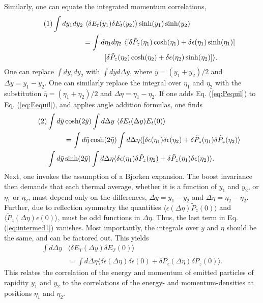 \documentclass[12pt]{article}
\numberwithin{equation}{section}
\numberwithin{figure}{section}
\newcommand\eqnumber{\addtocounter{equation}{1}\tag{\theequation}}
\begin{document}
Similarly, one can equate the integrated momentum correlations,
\begin{align*}\eqnumber\label{eq:Pequil}
\int dy_1dy_2&~\langle\delta E_t(y_1)\delta E_t(y_2)\rangle\sinh(y_1)\sinh(y_2)\\
&=\int d\eta_1d\eta_2~\langle[\delta \tilde{P}_z(\eta_1)\cosh(\eta_1)+\delta\epsilon(\eta_1)\sinh(\eta_1)]\\\
&\hspace*{30pt}[\delta\tilde{P}_z(\eta_2)\cosh(\eta_2)+\delta\epsilon(\eta_2)\sinh(\eta_2)]\rangle.
\end{align*}
One can replace $\int dy_1dy_2$ with $\int d\bar{y}d\Delta y$, where $\bar{y}=(y_1+y_2)/2$ and $\Delta y=y_1-y_2$. One can similarly replace the integral over $\eta_1$ and $\eta_2$ with the substitution $\bar{\eta}=(\eta_1+\eta_2)/2$ and $\Delta\eta=\eta_1-\eta_2$. If one adds Eq. (\ref{eq:Pequil}) to Eq. (\ref{eq:Eequil}), and applies angle addition formulas, one finds
\begin{align*}\eqnumber\label{eq:intermed1}
\int d\bar{y} &\cosh(2\bar{y})\int d\Delta y~\langle\delta E_t(\Delta y)E_t(0)\rangle\\
&=\int d\bar{\eta}\cosh(2\bar{\eta})\int d\Delta\eta\langle
[\delta\epsilon(\eta_1)\delta\epsilon(\eta_2)+\delta\tilde{P}_z(\eta_1)\delta\tilde{P}_z(\eta_2)\rangle\\
\int d\bar{y} &\sinh(2\bar{y})\int d\Delta\eta
\langle\delta\epsilon(\eta_1)\delta\tilde{P}_z(\eta_2)+\delta\tilde{P}_z(\eta_1)\delta\epsilon(\eta_2)\rangle.
\end{align*}
Next, one invokes the assumption of a Bjorken expansion. The boost invariance then demands that each thermal average, whether it is a function of $y_1$ and $y_2$, or $\eta_1$ or $\eta_2$, must depend only on the differences, $\Delta y=y_1-y_2$ and $\Delta\eta=\eta_2-\eta_2$. Further, due to reflection symmetry the quantities $\langle \epsilon(\Delta\eta)\tilde{P}_z(0)\rangle$ and $\langle \tilde{P}_z(\Delta\eta)\epsilon(0)\rangle$, must be odd functions in $\Delta\eta$. Thus, the last term in Eq. (\ref{eq:intermed1}) vanishes. Most importantly, the integrals over $\bar{y}$ and $\bar{\eta}$ should be the same, and can be factored out. This yields
\begin{align*}
\int d\Delta y&\langle \delta E_T(\Delta y)\delta E_T(0)\rangle\\
&=\int d\Delta\eta\langle \delta\epsilon(\Delta\eta)\delta\epsilon(0)+\delta\tilde{P}_z(\Delta\eta)\delta\tilde{P}_z(0)\rangle.
\end{align*}
This relates the correlation of the energy and momentum of emitted particles of rapidity $y_1$ and $y_2$ to the correlations of the energy- and momentum-densities at positions $\eta_1$ and $\eta_2$. 
\end{document}
